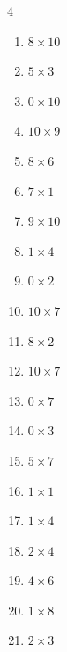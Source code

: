 \begin{multicols}{4}
\begin{enumerate}
  \item $8\times 10$
        \phantom{$=80$}

  \item $5\times 3$
        \phantom{$=15$}

  \item $0\times 10$
        \phantom{$=0$}

  \item $10\times 9$
        \phantom{$=90$}

\columnbreak %

  \item $8\times 6$
        \phantom{$=48$}

  \item $7\times 1$
        \phantom{$=7$}

  \item $9\times 10$
        \phantom{$=90$}

  \item $1\times 4$
        \phantom{$=4$}

  \item $0\times 2$
        \phantom{$=0$}

  \item $10\times 7$
        \phantom{$=70$}

  \item $8\times 2$
        \phantom{$=16$}

  \item $10\times 7$
        \phantom{$=70$}

  \item $0\times 7$
        \phantom{$=0$}

  \item $0\times 3$
        \phantom{$=0$}

  \item $5\times 7$
        \phantom{$=35$}

  \item $1\times 1$
        \phantom{$=1$}

  \item $1\times 4$
        \phantom{$=4$}

  \item $2\times 4$
        \phantom{$=8$}

  \item $4\times 6$
        \phantom{$=24$}

  \item $1\times 8$
        \phantom{$=8$}

  \item $2\times 3$
        \phantom{$=6$}


\end{enumerate}
\end{multicols}
